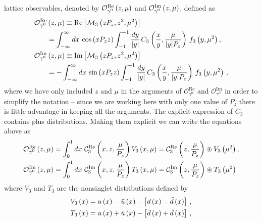 lattice observables, denoted by $\mathcal{O}_{\gamma^0}^{\text{Re}}\left( z, \mu
\right)$ and $\mathcal{O}_{\gamma^0}^{\text{Im}}\left( z, \mu \right)$, defined as 
\begin{align}
	  \mathcal{O}_{\gamma^0}^{\text{Re}}&\left( z, \mu \right) 
		  \equiv \text{Re} \left[\mathcal{M}_{3}\left( z P_z, z^2, \mu^2 \right)\right] 
           \nonumber \\
           &= \int_{-\infty}^{\infty} dx\, \cos{\left(x P_z z \right)} 
		  \int_{-1}^{+1} \frac{dy}{|y|}\, C_3\left(\frac{x}{y},\frac{\mu}{|y|P_z}\right)\, 
		  f_{3}\left(y,\mu^2\right), \\
	  \mathcal{O}_{\gamma^0}^{\text{Im}}&\left( z, \mu \right) 
          \equiv \text{Im} \left[\mathcal{M}_{3}\left( z P_z, z^2, \mu^2 \right)\right]
          \nonumber \\ 
		  &= -\int_{-\infty}^{\infty} dx\, \sin{\left(x P_z z \right)} 
		  \int_{-1}^{+1} \frac{dy}{|y|}\, C_3\left(\frac{x}{y},\frac{\mu}{|y|P_z}\right)\, 
		  f_3\left(y,\mu^2\right)\, , 
\end{align}  
where we have only included $z$ and $\mu$ in the arguments of
$\mathcal{O}_{\gamma^0}^{\text{Re}}$ and $\mathcal{O}_{\gamma^0}^{\text{Im}}$ in
order to simplify the notation -- since we are working here with only one value
of $P_z$ there is little advantage in keeping all the arguments. The explicit
expression of $C_3$ contains plus distributions. Making them explicit we can
write the equations above as
\begin{align}
	\label{eq::V3factorization}
	  & \mathcal{O}_{\gamma^0}^{\text{Re}}\left( z, \mu \right) = \int_{0}^{1} dx \,\, \mathcal{C}_3^{\text{Re}}\left( x, z, \frac{\mu}{P_z}  \right) V_3\left(x,\mu\right) = \mathcal{C}_3^{\text{Re}}\left( z, \frac{\mu}{P_z}  \right) \circledast V_3\left(\mu^2\right), \\
	\label{eq::T3factorization}
	  & \mathcal{O}_{\gamma^0}^{\text{Im}}\left( z, \mu \right) = \int_{0}^{1} dx \,\, \mathcal{C}_3^{\text{Im}}\left( x, z, \frac{\mu}{P_z}  \right) T_3\left(x,\mu\right)= \mathcal{C}_3^{\text{Im}}\left( z, \frac{\mu}{P_z}  \right) \circledast T_3\left(\mu^2\right)   
\end{align}
where $V_3$ and $T_3$ are the nonsinglet distributions defined by
\begin{align}
	  & V_3 \left( x \right) = u\left(x\right) - \bar{u}\left(x\right) -\left[d\left(x\right)-\bar{d}\left(x\right)\right]\, , \\
	  & T_3 \left( x \right) = u\left(x\right) + \bar{u}\left(x\right) -\left[d\left(x\right)+\bar{d}\left(x\right)\right]\, ,
\end{align}
